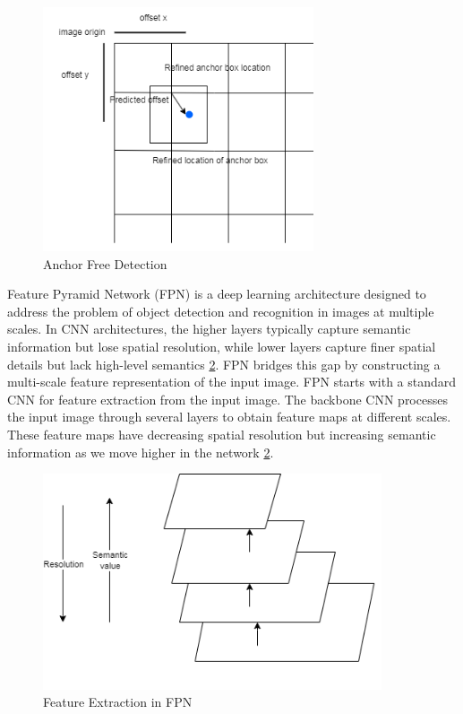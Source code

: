 \begin{figure}[H]
\centering
	\includegraphics*[width = 8cm]{images/Anchor-free.png}
	 \caption{Anchor Free Detection}
	\label{fig:anchor}
\end{figure}

\noindent Feature Pyramid Network (FPN)\cite{fpn} is a deep learning architecture designed to address the problem of object detection and recognition in images at multiple scales. In CNN architectures, the higher layers typically capture semantic information but lose spatial resolution, while lower layers capture finer spatial details but lack high-level semantics \ref{fig:variation}. FPN bridges this gap by constructing a multi-scale feature representation of the input image. FPN starts with a standard CNN for feature extraction from the input image. The backbone CNN processes the input image through several layers to obtain feature maps at different scales. These feature maps have decreasing spatial resolution but increasing semantic information as we move higher in the network \ref{fig:variation}.\\

\begin{figure}[H]
\centering
	\includegraphics*[width = 10cm]{images/variation.png}
	 \caption{Feature Extraction in FPN}
	\label{fig:variation}
\end{figure}

